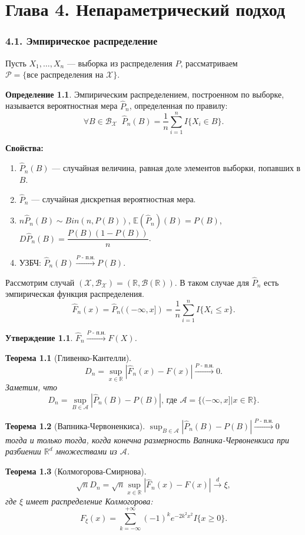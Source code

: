 \documentclass[12pt]{report}
\newtheorem{theorem}{Теорема}
\newtheorem{proposition}{Утверждение}
\theoremstyle{definition}
\newtheorem{definition}{Определение}
\begin{document}
\chapter{Глава 4. Непараметрический подход}
\subsection{4.1. Эмпирическое распределение}
Пусть $X_1, \ldots, X_n$ — выборка из распределения $P$, рассматриваем $\mathcal{P} = \{\text{все распределения на } \mathscr{X}\}$.
\begin{definition}
	Эмпирическим распределением, построенном по выборке, называется вероятностная мера $\hat{P}_n$, определенная по правилу:
	$$\forall B \in \mathcal{B}_\mathscr{X}\;\; \hat{P}_n(B) = \dfrac{1}{n}\displaystyle{\sum_{i=1}^n}I\{X_i \in B\}.$$
\end{definition}
\textbf{Свойства:}
\begin{enumerate}
	\item $\hat{P}_n(B)$ — случайная величина, равная доле элементов выборки, попавших в $B$.
	\item $\hat{P}_n$ — случайная дискретная вероятностная мера.
	\item $n\hat{P}_n(B) \sim Bin(n, P(B))$, $\mathbb{E}(\hat{P}_n)(B) = P(B)$, $D \hat{P}_n(B) = \dfrac{P(B)(1 - P(B))}{n}$.
	\item УЗБЧ: $\hat{P}_n(B) \xrightarrow{P\text{ - п.н.}} P(B)$.
\end{enumerate}
Рассмотрим случай $(\mathscr{X}, \mathscr{B}_\mathscr{X}) = (\mathbb{R}, \mathscr{B}(\mathbb{R}))$. В таком случае для $\hat{P}_n$ есть эмпирическая функция распределения.
$$\hat{F}_n(x) = \hat{P}_n((-\infty, x]) = \dfrac{1}{n}\displaystyle{\sum_{i=1}^n}I\{X_i \leqslant x\}.$$
\begin{proposition}
	$\hat{F}_n \xrightarrow{P \text{ - п.н.}} F(X)$.
\end{proposition}
\begin{theorem}[Гливенко-Кантелли]
	$$D_n = \displaystyle{\sup_{x \in \mathbb{R}}} |\hat{F}_n(x) - F(x)| \xrightarrow{P \text{ - п.н.}} 0.$$
	Заметим, что
	$$D_n = \displaystyle{\sup_{B \in \mathscr{A}}} |\hat{P}_n(B) - P(B)| \text{, где } \mathscr{A} = \{(-\infty, x]| x \in \mathbb{R}\}.$$
\end{theorem}
\begin{theorem}[Вапника-Червоненкиса]
	$\displaystyle{\sup_{B \in \mathscr{A}}} |\hat{P}_n(B) - P(B)| \xrightarrow{P \text{ - п.н.}} 0$ тогда и только тогда, когда конечна размерность Вапника-Червоненкиса при разбиении $\mathbb{R}^d$ множествами из $\mathscr{A}$.
\end{theorem}
\begin{theorem}[Колмогорова-Смирнова]
	$$\sqrt{n}D_n = \sqrt{n}\displaystyle{\sup_{x \in \mathbb{R}}} |\hat{F}_n(x) - F(x)| \xrightarrow{d} \xi,$$
	где $\xi$ имеет распределение Колмогорова:
	$$F_\xi(x) = \displaystyle{\sum_{k=-\infty}^{+\infty}}(-1)^k e^{-2k^2 x^2} I\{x \geqslant 0\}.$$
\end{theorem}
\end{document}
